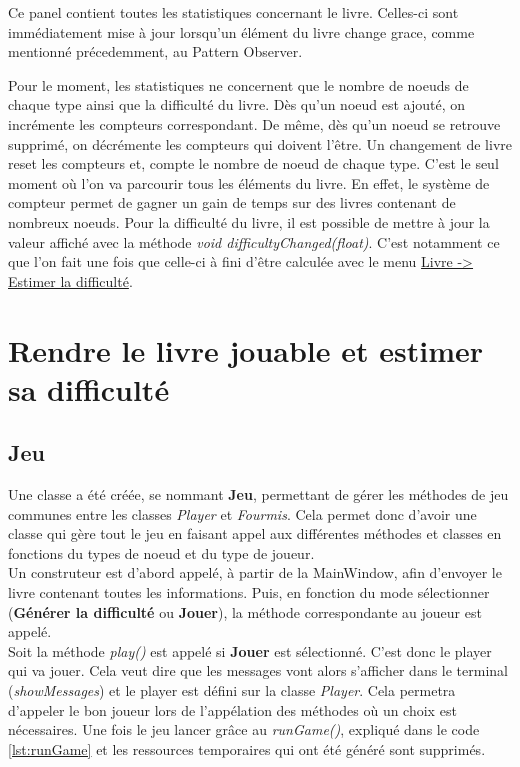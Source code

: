 			Ce panel contient toutes les statistiques concernant le livre. Celles-ci sont immédiatement mise à jour lorsqu'un élément du livre change grace, comme mentionné précedemment, au Pattern Observer.

			Pour le moment, les statistiques ne concernent que le nombre de noeuds de chaque type ainsi que la difficulté du livre. Dès qu'un noeud est ajouté, on incrémente les compteurs correspondant. De même, dès qu'un noeud se retrouve supprimé, on décrémente les compteurs qui doivent l'être. Un changement de livre reset les compteurs et, compte le nombre de noeud de chaque type. C'est le seul moment où l'on va parcourir tous les éléments du livre. En effet, le système de compteur permet de gagner un gain de temps sur des livres contenant de nombreux noeuds. Pour la difficulté du livre, il est possible de mettre à jour la valeur affiché avec la méthode \textit{void difficultyChanged(float)}. C'est notamment ce que l'on fait une fois que celle-ci à fini d'être calculée avec le menu \underline{Livre -> Estimer la difficulté}.

	\section{Rendre le livre jouable et estimer sa difficulté}\label{sec:Jeu}

		\subsection{Jeu}

			Une classe a été créée, se nommant \textbf{Jeu}, permettant de gérer les méthodes de jeu communes entre les classes \textit{Player} et \textit{Fourmis}. Cela permet donc d'avoir une classe qui gère tout le jeu en faisant appel aux différentes méthodes et classes en fonctions du types de noeud et du type de joueur. \\
			Un construteur est d'abord appelé, à partir de la MainWindow, afin d'envoyer le livre contenant toutes les informations. Puis, en fonction du mode sélectionner (\textbf{Générer la difficulté} ou \textbf{Jouer}), la méthode correspondante au joueur est appelé.\\

			Soit la méthode \textit{play()} est appelé si \textbf{Jouer} est sélectionné. C'est donc le player qui va jouer. Cela veut dire que les messages vont alors s'afficher dans le terminal (\textit{showMessages}) et le player est défini sur la classe \textit{Player}. Cela permetra d'appeler le bon joueur lors de l'appélation des méthodes où un choix est nécessaires.
			Une fois le jeu lancer grâce au \textit{runGame()}, expliqué dans le code \ref{lst:runGame} et les ressources temporaires qui ont été généré sont supprimés.

